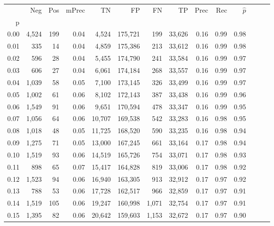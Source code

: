 \begin{tabular}{rrrrrrrrrrrrrr}
\toprule
{} &    Neg &  Pos & mPrec &       TN &       FP &      FN &      TP &  Prec &   Rec & $\hat{p}$ \\
p    &        &      &       &          &          &         &         &       &       &           \\
\midrule
0.00 &  4,524 &  199 &  0.04 &    4,524 &  175,721 &     199 &  33,626 &  0.16 &  0.99 &      0.98 \\
0.01 &    335 &   14 &  0.04 &    4,859 &  175,386 &     213 &  33,612 &  0.16 &  0.99 &      0.98 \\
0.02 &    596 &   28 &  0.04 &    5,455 &  174,790 &     241 &  33,584 &  0.16 &  0.99 &      0.97 \\
0.03 &    606 &   27 &  0.04 &    6,061 &  174,184 &     268 &  33,557 &  0.16 &  0.99 &      0.97 \\
0.04 &  1,039 &   58 &  0.05 &    7,100 &  173,145 &     326 &  33,499 &  0.16 &  0.99 &      0.97 \\
0.05 &  1,002 &   61 &  0.06 &    8,102 &  172,143 &     387 &  33,438 &  0.16 &  0.99 &      0.96 \\
0.06 &  1,549 &   91 &  0.06 &    9,651 &  170,594 &     478 &  33,347 &  0.16 &  0.99 &      0.95 \\
0.07 &  1,056 &   64 &  0.06 &   10,707 &  169,538 &     542 &  33,283 &  0.16 &  0.98 &      0.95 \\
0.08 &  1,018 &   48 &  0.05 &   11,725 &  168,520 &     590 &  33,235 &  0.16 &  0.98 &      0.94 \\
0.09 &  1,275 &   71 &  0.05 &   13,000 &  167,245 &     661 &  33,164 &  0.17 &  0.98 &      0.94 \\
0.10 &  1,519 &   93 &  0.06 &   14,519 &  165,726 &     754 &  33,071 &  0.17 &  0.98 &      0.93 \\
0.11 &    898 &   65 &  0.07 &   15,417 &  164,828 &     819 &  33,006 &  0.17 &  0.98 &      0.92 \\
0.12 &  1,523 &   94 &  0.06 &   16,940 &  163,305 &     913 &  32,912 &  0.17 &  0.97 &      0.92 \\
0.13 &    788 &   53 &  0.06 &   17,728 &  162,517 &     966 &  32,859 &  0.17 &  0.97 &      0.91 \\
0.14 &  1,519 &  105 &  0.06 &   19,247 &  160,998 &   1,071 &  32,754 &  0.17 &  0.97 &      0.91 \\
0.15 &  1,395 &   82 &  0.06 &   20,642 &  159,603 &   1,153 &  32,672 &  0.17 &  0.97 &      0.90 \\

\end{tabular}
